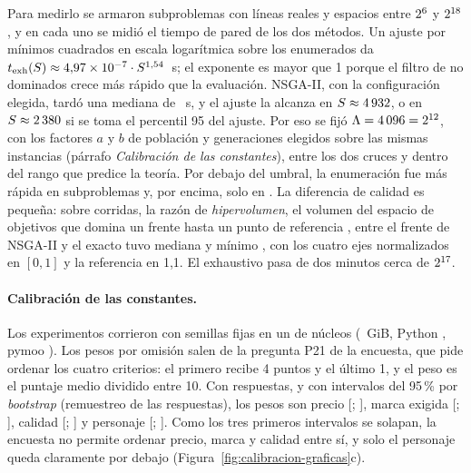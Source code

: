 Para medirlo se armaron \calSubproblemas{} subproblemas con líneas reales y espacios entre $2^{6}$
y $2^{18}$, y en cada uno se midió el tiempo de pared de los dos métodos. Un
ajuste por mínimos cuadrados en escala logarítmica sobre los \calSubproblemasExacto{} enumerados da $t_{\mathrm{exh}}(S)\approx4{,}97\times10^{-7}\cdot S^{1{,}54}$~s; el exponente es
mayor que 1 porque el filtro de no dominados crece más rápido que la evaluación. NSGA-II, con la
configuración elegida, tardó una mediana de \calTNsgaElegidaMediana~s, y el ajuste la alcanza en
$S\approx4\,932$, o en $S\approx2\,380$ si se toma el percentil 95 del ajuste.
Por eso se fijó $\Lambda=4\,096=2^{12}$, con los factores $a$ y $b$ de población y generaciones elegidos sobre las mismas
instancias (párrafo \emph{Calibración de las constantes}), entre los dos cruces y dentro del rango que
predice la teoría. Por debajo del umbral, la enumeración fue más rápida en
\calExactoGanaBajoElegida{} subproblemas y, por encima, solo en \calExactoGanaSobreElegida. La
diferencia de calidad es pequeña: sobre \calCorridasHV{} corridas, la razón de
\emph{hipervolumen}, el volumen del espacio de objetivos que domina un frente hasta un punto de
referencia \citep{zitzler_multiobjective_1999}, entre el frente de NSGA-II y el exacto tuvo mediana
\calRazonHVMediana{} y mínimo \calRazonHVMin, con los cuatro ejes normalizados en $[0,1]$ y la
referencia en 1,1.  El exhaustivo pasa de dos minutos cerca de $2^{17}$.

\paragraph{Calibración de las constantes.} Los experimentos corrieron con semillas fijas en un \calCPU{} de
\calNucleos{} núcleos (\calRAM~GiB, Python \calPython{}, pymoo \calPymoo). Los pesos por omisión salen de la pregunta P21 de la encuesta, que pide ordenar los cuatro
criterios: el primero recibe 4 puntos y el último 1, y el peso es el puntaje medio dividido entre 10.
Con \calEncuestados{} respuestas, y con intervalos del 95\,\% por \emph{bootstrap}
\citep{efron_bootstrap_1979} (remuestreo de las respuestas), los pesos son precio \calWPrecio{} [\calWPrecioBajo; \calWPrecioAlto],
marca exigida \calWMarca{} [\calWMarcaBajo; \calWMarcaAlto], calidad \calWCalidad{}
[\calWCalidadBajo; \calWCalidadAlto] y personaje \calWPersonaje{} [\calWPersonajeBajo;
\calWPersonajeAlto]. Como los tres primeros intervalos se solapan, la encuesta no permite ordenar precio, marca y
calidad entre sí, y solo el personaje queda claramente por debajo (Figura~\ref{fig:calibracion-graficas}c).

